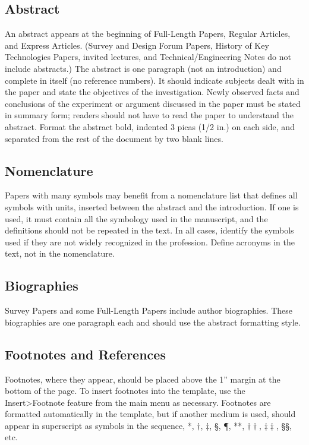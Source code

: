 \documentclass[journal]{new-aiaa}
\begin{document}
\subsection{Abstract}
An abstract appears at the beginning of Full-Length Papers, Regular Articles, and Express Articles. (Survey and Design Forum Papers, History of Key Technologies Papers, invited lectures, and Technical/Engineering Notes do not include abstracts.) The abstract is one paragraph (not an introduction) and complete in itself (no reference numbers). It should indicate subjects dealt with in the paper and state the objectives of the investigation. Newly observed facts and conclusions of the experiment or argument discussed in the paper must be stated in summary form; readers should not have to read the paper to understand the abstract. Format the abstract bold, indented 3 picas (1/2 in.) on each side, and separated from the rest of the document by two blank lines.


\subsection{Nomenclature}
Papers with many symbols may benefit from a nomenclature list that defines all symbols with units, inserted between the abstract and the introduction. If one is used, it must contain all the symbology used in the manuscript, and the definitions should not be repeated in the text. In all cases, identify the symbols used if they are not widely recognized in the profession. Define acronyms in the text, not in the nomenclature. 

\subsection{Biographies}
Survey Papers and some Full-Length Papers include author biographies. These biographies are one paragraph each and should use the abstract formatting style.

\subsection{Footnotes and References}
Footnotes, where they appear, should be placed above the 1'' margin at the bottom of the page. To insert footnotes into the template, use the Insert>Footnote feature from the main menu as necessary. Footnotes are formatted automatically in the template, but if another medium is used, should appear in superscript as symbols in the sequence, *, $\dag$, $\ddag$, \S, \P, **, $\dag\dag$, $\ddag\ddag$, \S\S, etc.
\end{document}
